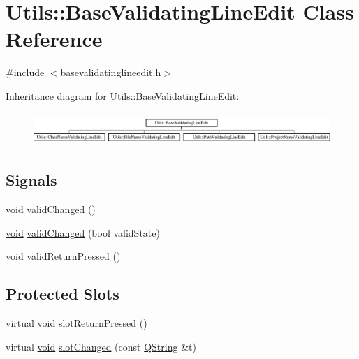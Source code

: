 \hypertarget{class_utils_1_1_base_validating_line_edit}{\section{\-Utils\-:\-:\-Base\-Validating\-Line\-Edit \-Class \-Reference}
\label{class_utils_1_1_base_validating_line_edit}
}


{\ttfamily \#include $<$basevalidatinglineedit.\-h$>$}

\-Inheritance diagram for \-Utils\-:\-:\-Base\-Validating\-Line\-Edit\-:\begin{figure}[H]
\begin{center}
\leavevmode
\includegraphics[height=1.261261cm]{class_utils_1_1_base_validating_line_edit}
\end{center}
\end{figure}
\subsection*{\-Signals}
\begin{DoxyCompactItemize}
\item 
\hyperlink{group___u_a_v_objects_plugin_ga444cf2ff3f0ecbe028adce838d373f5c}{void} \hyperlink{class_utils_1_1_base_validating_line_edit_a870ff192086bf4c4a0a9a0b08d627c08}{valid\-Changed} ()
\item 
\hyperlink{group___u_a_v_objects_plugin_ga444cf2ff3f0ecbe028adce838d373f5c}{void} \hyperlink{class_utils_1_1_base_validating_line_edit_ac0df0e8ad47ecded73920f823fa1a425}{valid\-Changed} (bool valid\-State)
\item 
\hyperlink{group___u_a_v_objects_plugin_ga444cf2ff3f0ecbe028adce838d373f5c}{void} \hyperlink{class_utils_1_1_base_validating_line_edit_a4eabb0eea13a9067d93e1fffd1e3fc6d}{valid\-Return\-Pressed} ()
\end{DoxyCompactItemize}
\subsection*{\-Protected \-Slots}
\begin{DoxyCompactItemize}
\item 
virtual \hyperlink{group___u_a_v_objects_plugin_ga444cf2ff3f0ecbe028adce838d373f5c}{void} \hyperlink{class_utils_1_1_base_validating_line_edit_a7c452527ffd93e1b201f0d3e2340ee36}{slot\-Return\-Pressed} ()
\item 
virtual \hyperlink{group___u_a_v_objects_plugin_ga444cf2ff3f0ecbe028adce838d373f5c}{void} \hyperlink{class_utils_1_1_base_validating_line_edit_ab20d444798b262703c012c68bbfdf44e}{slot\-Changed} (const \hyperlink{group___u_a_v_objects_plugin_gab9d252f49c333c94a72f97ce3105a32d}{\-Q\-String} \&t)
\end{DoxyCompactItemize}
